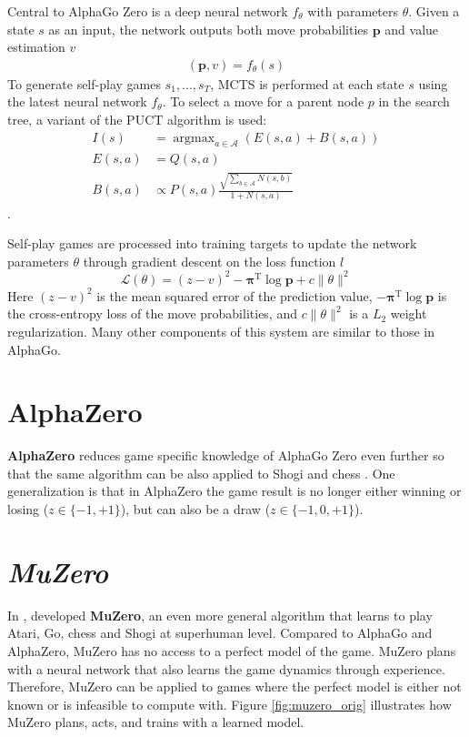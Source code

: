 Central to AlphaGo Zero is a deep neural network $f_\theta$ with parameters $\theta$.
Given a state $s$ as an input, the network outputs both move probabilities $\pmb{p}$ and value estimation $v$
\begin{align*}
    (\mathbf{p}, v) = f_\theta(s)
\end{align*}
To generate self-play games $s_1, ..., s_T$, MCTS is performed at each state $s$ using the latest neural network $f_\theta$.
To select a move for a parent node $p$ in the search tree, a variant of the PUCT algorithm is used:
\begin{align*}
    I(s)     & = \operatorname{argmax}_{a \in \mathcal{A}} \left( E(s, a) + B(s, a) \right)  \\
    E(s, a)  & = Q(s, a)  \\
    B(s, a)  & \propto P(s, a) \frac{\sqrt{\sum_{b \in \mathcal{A}}{N(s, b)}}}{1+N(s, a)}
\end{align*} \label{sec:puct}.

Self-play games are processed into training targets to update the network parameters $\theta$ through gradient descent on the loss function $l$
\begin{equation*}
    \mathcal{L}(\theta) = (z-v)^{2} - \pmb{\pi}^{\mathrm{T}} \log \pmb{p}+c\|\theta\|^{2}
\end{equation*}
Here $(z-v)^2$ is the mean squared error of the prediction value,
$-\pmb{\pi}^{\mathrm{T}} \log \pmb{p}$ is the cross-entropy loss of the move probabilities,
and $c\|\theta\|^2$ is a $L_2$ weight regularization.
Many other components of this system are similar to those in AlphaGo.

\section{AlphaZero}
\textbf{AlphaZero} reduces game specific knowledge of AlphaGo Zero even further so that the same algorithm can be also applied to Shogi and chess
\cite{MasteringChessShogi_Silver.Hubert.ea_2017}.
One generalization is that in AlphaZero the game result is no longer either winning or losing ($z \in \{ -1, +1 \}$), but can also be a draw ($z \in \{-1, 0, +1 \}$).

\section{\textit{MuZero}} \label{sec:muzero}
In \citeyear{MasteringAtariGo_Schrittwieser.Antonoglou.ea_2020},
\citeauthor{MasteringAtariGo_Schrittwieser.Antonoglou.ea_2020} developed
\textbf{MuZero}, an even more general algorithm that learns to play Atari, Go, chess and Shogi at superhuman level.
Compared to AlphaGo and AlphaZero,
MuZero has no access to a perfect model of the game.
MuZero plans with a neural network that also learns the game dynamics through experience.
Therefore, MuZero can be applied to games where the perfect model is either not known or is infeasible to compute with.
Figure \ref{fig:muzero_orig} illustrates how MuZero plans, acts, and trains with a learned model.

